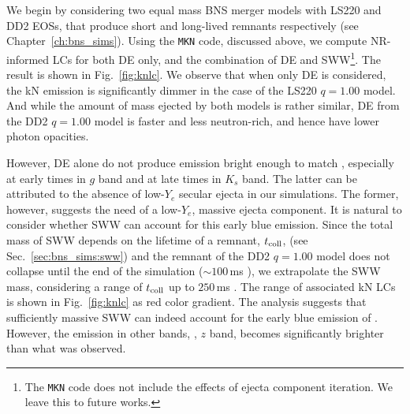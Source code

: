 We begin by considering two equal mass \ac{BNS} merger models with LS220 
and DD2 \acp{EOS}, that produce short and long-lived \pmerg{} remnants respectively
(see Chapter~\ref{ch:bns_sims}). 
Using the \texttt{MKN} code, discussed above, we compute \ac{NR}-informed 
\acp{LC} for both \ac{DE} only, and the combination of \ac{DE} and \ac{SWW}\footnote{
    The \texttt{MKN} code does not include the effects of ejecta component 
    iteration. We leave this to future works.
}. 
The result is shown in Fig.~\ref{fig:knlc}. We observe that
when only \ac{DE} is considered, the \ac{kN} emission is 
significantly dimmer in the case of the LS220 $q=1.00$ model.
%
And while the amount of mass ejected by both models is rather similar,  
\ac{DE} from the DD2 $q=1.00$ model is faster and less neutron-rich, and hence 
have lower photon opacities. 

However, \ac{DE} alone do not produce emission bright enough to 
match \AT{}, especially at early times in $g$ band and at late times in $K_s$ band. 
The latter can be attributed to the absence of low-$Y_e$ secular ejecta in 
our simulations. 
The former, however, 
suggests the need of a low-$Y_e$, massive ejecta component. 
%
It is natural to consider whether \ac{SWW} can account for this early 
blue emission. Since the total mass of \ac{SWW} depends on the 
lifetime of a remnant, $t_{\rm coll}$, (see Sec.~\ref{sec:bns_sims:sww}) 
and the remnant of the DD2 $q=1.00$ model does not collapse until the end of 
the simulation (${\sim}100\,$ms \pmerg{}), we extrapolate the \ac{SWW} mass, 
considering a range of $t_{\rm coll}$ up to $250\,$ms \pmerg{}. The range of 
associated \ac{kN} \acp{LC} is shown in Fig.~\ref{fig:knlc} as red color gradient. 
%
The analysis suggests that sufficiently massive \ac{SWW} can indeed 
account for the early blue emission of \AT{}. However, the emission 
in other bands, \eg, $z$ band, becomes significantly brighter than 
what was observed. 

